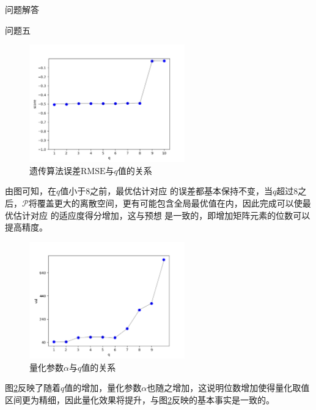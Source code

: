 \documentclass[11pt]{article}
\begin{document}
\begin{section}{问题解答}
\begin{subsection}{问题五}
   \begin{figure}[H]
     \centering
     \includegraphics[width=0.6\textwidth]{问题五score.png}
     \caption{遗传算法误差$\mathrm{RMSE}$与$q$值的关系}
     \label{fig:遗传算法误差与q值的关系}
   \end{figure}
   由图可知，在$q$值小于8之前，最优估计对应 的误差都基本保持不变，当$q$超过8之后，$\mathcal{P}$将覆盖更大的离散空间，更有可能包含全局最优值在内，因此完成可以使最优估计对应 的适应度得分增加，这与预想 是一致的，即增加矩阵元素的位数可以提高精度。
   \begin{figure}[H]
     \centering
     \includegraphics[width=0.6\textwidth]{问题五val.png}
     \caption{量化参数$\alpha$与$q$值的关系}
     \label{fig:量化参数与q值的关系}
   \end{figure}
 \end{subsection}
 图\ref{fig:量化参数与q值的关系}反映了随着$q$值的增加，量化参数$\alpha$也随之增加，这说明位数增加使得量化取值区间更为精细，因此量化效果将提升，与图\ref{fig:量化参数与q值的关系}反映的基本事实是一致的。
\end{section}
\end{document}
